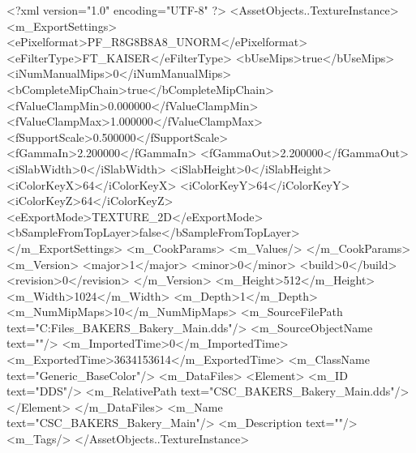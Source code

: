 <?xml version="1.0" encoding="UTF-8" ?>
<AssetObjects..TextureInstance>
	<m_ExportSettings>
		<ePixelformat>PF_R8G8B8A8_UNORM</ePixelformat>
		<eFilterType>FT_KAISER</eFilterType>
		<bUseMips>true</bUseMips>
		<iNumManualMips>0</iNumManualMips>
		<bCompleteMipChain>true</bCompleteMipChain>
		<fValueClampMin>0.000000</fValueClampMin>
		<fValueClampMax>1.000000</fValueClampMax>
		<fSupportScale>0.500000</fSupportScale>
		<fGammaIn>2.200000</fGammaIn>
		<fGammaOut>2.200000</fGammaOut>
		<iSlabWidth>0</iSlabWidth>
		<iSlabHeight>0</iSlabHeight>
		<iColorKeyX>64</iColorKeyX>
		<iColorKeyY>64</iColorKeyY>
		<iColorKeyZ>64</iColorKeyZ>
		<eExportMode>TEXTURE_2D</eExportMode>
		<bSampleFromTopLayer>false</bSampleFromTopLayer>
	</m_ExportSettings>
	<m_CookParams>
		<m_Values/>
	</m_CookParams>
	<m_Version>
		<major>1</major>
		<minor>0</minor>
		<build>0</build>
		<revision>0</revision>
	</m_Version>
	<m_Height>512</m_Height>
	<m_Width>1024</m_Width>
	<m_Depth>1</m_Depth>
	<m_NumMipMaps>10</m_NumMipMaps>
	<m_SourceFilePath text="C:\Users\Shadow\Desktop\Working Files\Textures\CSC_BAKERS_Bakery_Main.dds"/>
	<m_SourceObjectName text=""/>
	<m_ImportedTime>0</m_ImportedTime>
	<m_ExportedTime>3634153614</m_ExportedTime>
	<m_ClassName text="Generic_BaseColor"/>
	<m_DataFiles>
		<Element>
			<m_ID text="DDS"/>
			<m_RelativePath text="CSC_BAKERS_Bakery_Main.dds"/>
		</Element>
	</m_DataFiles>
	<m_Name text="CSC_BAKERS_Bakery_Main"/>
	<m_Description text=""/>
	<m_Tags/>
</AssetObjects..TextureInstance>

